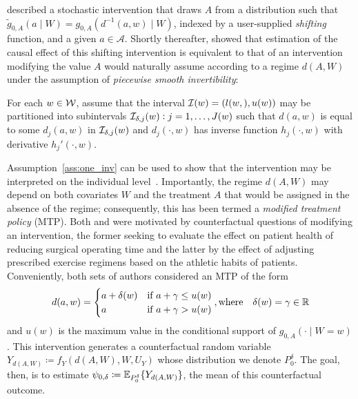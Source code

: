 \citet{diaz2012population} described a stochastic intervention that draws $A$
from a distribution such that $\tilde{g}_{0,A}(a \mid W) = g_{0,A}(d^{-1}(a, w)
\mid W)$, indexed by a user-supplied \textit{shifting} function, and
a given $a \in \mathcal{A}$. Shortly thereafter, \citet{haneuse2013estimation}
showed that estimation of the causal effect of this shifting intervention is
equivalent to that of an intervention modifying the value $A$ would naturally
assume according to a regime $d(A,W)$ under the assumption of
\textit{piecewise smooth invertibility}:
\begin{assumptioniden}\label{ass:one_inv}
  For each $w \in \cal W$, assume that the interval
  ${\cal I}(w) = (l(w,), u(w))$ may be partitioned into subintervals
  ${\cal I}_{\delta,j}(w):j = 1, \ldots, J(w)$ such that $d(a, w)$ is equal to
  some $d_j(a, w)$ in ${\cal I}_{\delta,j}(w)$ and $d_j(\cdot,w)$ has inverse
  function $h_j(\cdot, w)$ with derivative $h_j'(\cdot, w)$.
\end{assumptioniden}
Assumption~\ref{ass:one_inv} can be used to show that the intervention may be
interpreted on the individual level~\citep{young2014identification}.
Importantly, the regime $d(A,W)$ may depend on both covariates $W$ and the
treatment $A$ that would be assigned in the absence of the regime; consequently,
this has been termed a \textit{modified treatment policy} (MTP). Both
\citet{haneuse2013estimation} and \citet{diaz2018stochastic} were motivated by
counterfactual questions of modifying an intervention, the former seeking to
evaluate the effect on patient health of reducing surgical operating time and
the latter by the effect of adjusting prescribed exercise regimens based on the
athletic habits of patients. Conveniently, both sets of authors considered an
MTP of the form
\begin{equation}\label{eqn:one_defn_shift}
  d(a, w) =
  \begin{cases}
    a + \delta(w) & \text{if } a + \gamma \leq u(w) \\
    a & \text{if } a + \gamma > u(w)
  \end{cases},
  \text{where} \quad \delta(w) = \gamma \in \mathbb{R}
\end{equation}
and $u(w)$ is the maximum value in the conditional support of $g_{0,A}(\cdot
\mid W = w)$. This intervention generates a counterfactual random variable
$Y_{d(A, W)} \coloneqq f_Y(d(A, W), W, U_Y)$ whose distribution we denote
$P_0^{\delta}$. The goal, then, is to estimate $\psi_{0, \delta} \coloneqq
\mathbb{E}_{P_0^{\delta}} \{ Y_{d(A, W)} \}$, the mean of this counterfactual outcome.

